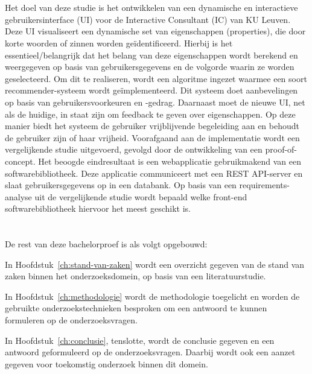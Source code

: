 \section{}%
\label{sec:onderzoeksdoelstelling}
Het doel van deze studie is het ontwikkelen van een dynamische en interactieve gebruikersinterface (UI) voor de Interactive Consultant (IC) van KU Leuven. Deze UI visualiseert een dynamische set van eigenschappen (properties), die door korte woorden of zinnen worden geïdentificeerd. Hierbij is het essentieel/belangrijk dat het belang van deze eigenschappen wordt berekend en weergegeven op basis van gebruikersgegevens en de volgorde waarin ze worden geselecteerd. Om dit te realiseren, wordt een algoritme ingezet waarmee een soort recommender-systeem wordt geïmplementeerd. Dit systeem doet aanbevelingen op basis van gebruikersvoorkeuren en -gedrag. Daarnaast moet de nieuwe UI, net als de huidige, in staat zijn om feedback te geven over eigenschappen. Op deze manier biedt het systeem de gebruiker vrijblijvende begeleiding aan en behoudt de gebruiker zijn of haar vrijheid. Voorafgaand aan de implementatie wordt een vergelijkende studie uitgevoerd, gevolgd door de ontwikkeling van een proof-of-concept. Het beoogde eindresultaat is een webapplicatie gebruikmakend van een softwarebibliotheek. Deze applicatie communiceert met een REST API-server en slaat gebruikersgegevens op in een databank. Op basis van een requirements-analyse uit de vergelijkende studie wordt bepaald welke front-end softwarebibliotheek hiervoor het meest geschikt is.


\section{}%
\label{sec:opzet-bachelorproef}


De rest van deze bachelorproef is als volgt opgebouwd:

In Hoofdstuk~\ref{ch:stand-van-zaken} wordt een overzicht gegeven van de stand van zaken binnen het onderzoeksdomein, op basis van een literatuurstudie.

In Hoofdstuk~\ref{ch:methodologie} wordt de methodologie toegelicht en worden de gebruikte onderzoekstechnieken besproken om een antwoord te kunnen formuleren op de onderzoeksvragen.


In Hoofdstuk~\ref{ch:conclusie}, tenslotte, wordt de conclusie gegeven en een antwoord geformuleerd op de onderzoeksvragen. Daarbij wordt ook een aanzet gegeven voor toekomstig onderzoek binnen dit domein.